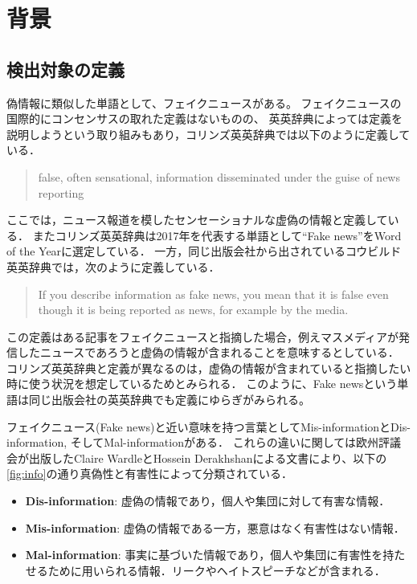 \chapter{背景}
\label{ch:background}
\section{検出対象の定義}
偽情報に類似した単語として、フェイクニュースがある。
フェイクニュースの国際的にコンセンサスの取れた定義はないものの、
英英辞典によっては定義を説明しようという取り組みもあり，コリンズ英英辞典では以下のように定義している\cite{collins_fake}．
\begin{quote}
    false, often sensational, information disseminated under the guise of news reporting
\end{quote}
ここでは，ニュース報道を模したセンセーショナルな虚偽の情報と定義している．
またコリンズ英英辞典は2017年を代表する単語として``Fake news''をWord of the Yearに選定している\cite{collins_word}．
一方，同じ出版会社から出されているコウビルド英英辞典では，次のように定義している\cite{collins_fake}．
\begin{quote}
    If you describe information as fake news, you mean that it is false even though it is being reported as news, for example by the media.
\end{quote}
この定義はある記事をフェイクニュースと指摘した場合，例えマスメディアが発信したニュースであろうと虚偽の情報が含まれることを意味するとしている．
コリンズ英英辞典と定義が異なるのは，虚偽の情報が含まれていると指摘したい時に使う状況を想定しているためとみられる．
このように、Fake newsという単語は同じ出版会社の英英辞典でも定義にゆらぎがみられる。

フェイクニュース(Fake news)と近い意味を持つ言葉としてMis-informationとDis-information, そしてMal-informationがある．
これらの違いに関しては欧州評議会が出版したClaire WardleとHossein Derakhshanによる文書により、以下の\cref{fig:info}の通り真偽性と有害性によって分類されている\cite{wardle2017information}．

\begin{itemize}
    \item \textbf{Dis-information}: 虚偽の情報であり，個人や集団に対して有害な情報．
    \item \textbf{Mis-information}: 虚偽の情報である一方，悪意はなく有害性はない情報．%
    \item \textbf{Mal-information}: 事実に基づいた情報であり，個人や集団に有害性を持たせるために用いられる情報．リークやヘイトスピーチなどが含まれる．
\end{itemize}

